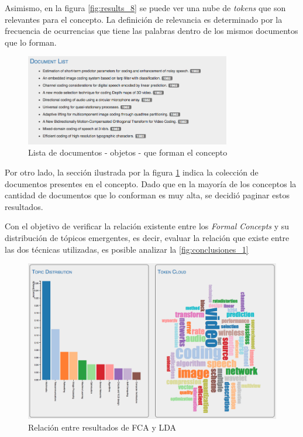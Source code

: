 \documentclass[12pt,oneside,letterpaper]{book}
\newcommand{\eng}[1]{\textit{#1}\xspace}			%
\newcommand{\abr}[1]{\textsc{#1}\xspace}           %
\theoremstyle{definition}
\begin{document}
Asimismo, en la figura \ref{fig:results_8} se puede ver una nube de \eng{tokens} que son relevantes para el concepto. La definición de relevancia es determinado por la frecuencia de ocurrencias que tiene las palabras dentro de los mismos documentos que lo forman.

\newpage

 \begin{figure}[h!]
	\centering
	\includegraphics[width=0.8\textwidth]{images/results_9.png}
	\caption{Lista de documentos - objetos - que forman el concepto}
	\label{fig:results_9}
\end{figure}

Por otro lado, la sección ilustrada por la figura \ref{fig:results_9} indica la colección de documentos presentes en el concepto. Dado que en la mayoría de los conceptos la cantidad de documentos que lo conforman es muy alta, se decidió paginar estos resultados.

\clearpage

Con el objetivo de verificar la relación existente entre los \eng{Formal Concepts} y su distribución de tópicos emergentes, es decir, evaluar la relación que existe entre las dos técnicas utilizadas, es posible analizar la \autoref{fig:conclusiones_1}

\begin{figure}[h!]
	\centering
	\includegraphics[width=1\textwidth]{images/conclusiones_1.png}
	\caption{Relación entre resultados de \abr{FCA} y \abr{LDA}}
	\label{fig:conclusiones_1}
\end{figure}
\end{document}
